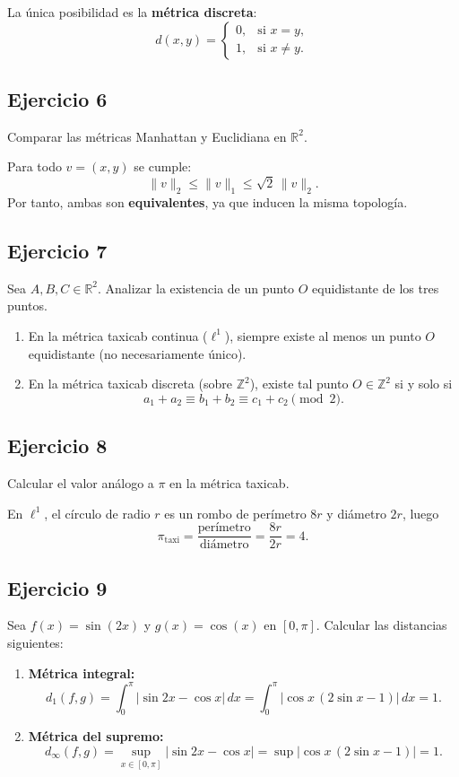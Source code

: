 \medskip
La única posibilidad es la \textbf{métrica discreta}:
\[
d(x,y) = 
\begin{cases}
0, & \text{si } x=y,\\
1, & \text{si } x\neq y.
\end{cases}
\]

\subsection*{Ejercicio 6}
Comparar las métricas Manhattan y Euclidiana en $\mathbb{R}^2$.

\medskip
Para todo $v=(x,y)$ se cumple:
\[
\|v\|_2 \le \|v\|_1 \le \sqrt{2}\,\|v\|_2.
\]
Por tanto, ambas son \textbf{equivalentes}, ya que inducen la misma topología.

\subsection*{Ejercicio 7}
Sea $A,B,C\in\mathbb{R}^2$. Analizar la existencia de un punto $O$ equidistante de los tres puntos.

\begin{enumerate}[label=\alph*)]
\item En la métrica taxicab continua ($\ell^1$), siempre existe al menos un punto $O$ equidistante (no necesariamente único).
\item En la métrica taxicab discreta (sobre $\mathbb{Z}^2$), existe tal punto $O\in\mathbb{Z}^2$ si y solo si
\[
a_1+a_2 \equiv b_1+b_2 \equiv c_1+c_2 \pmod 2.
\]
\end{enumerate}

\subsection*{Ejercicio 8}
Calcular el valor análogo a $\pi$ en la métrica taxicab.

\medskip
En $\ell^1$, el círculo de radio $r$ es un rombo de perímetro $8r$ y diámetro $2r$, luego
\[
\pi_{\text{taxi}} = \frac{\text{perímetro}}{\text{diámetro}} = \frac{8r}{2r} = 4.
\]

\subsection*{Ejercicio 9}
Sea $f(x)=\sin(2x)$ y $g(x)=\cos(x)$ en $[0,\pi]$. Calcular las distancias siguientes:

\begin{enumerate}[label=\alph*)]
\item \textbf{Métrica integral:}
\[
d_1(f,g) = \int_0^\pi |\sin 2x - \cos x|\,dx 
= \int_0^\pi |\cos x\,(2\sin x - 1)|\,dx = 1.
\]

\item \textbf{Métrica del supremo:}
\[
d_\infty(f,g) = \sup_{x\in[0,\pi]} |\sin 2x - \cos x|
= \sup |\cos x\,(2\sin x - 1)| = 1.
\]
\end{enumerate}

